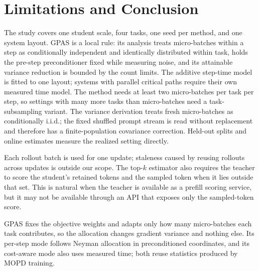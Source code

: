 \section{Limitations and Conclusion}
\label{sec:conclusion}

The study covers one student scale, four tasks, one seed per method, and one
system layout. GPAS is a local rule: its analysis treats micro-batches within
a step as conditionally independent and identically distributed within task,
holds the pre-step preconditioner fixed while
measuring noise, and its attainable variance reduction is bounded by the count
limits. The additive step-time model is fitted to one layout; systems with
parallel critical paths require their own measured time model. The method needs
at least two micro-batches per task per step, so settings with many more tasks
than micro-batches need a task-subsampling variant.
The variance derivation treats fresh micro-batches as conditionally i.i.d.; the
fixed shuffled prompt stream is read without replacement and therefore has a
finite-population covariance correction. Held-out splits and online estimates
measure the realized setting directly.

Each rollout batch is used for one update; staleness caused by reusing rollouts
across updates is outside our scope. The top-$k$ estimator also requires the
teacher to score the student's retained tokens and the sampled token when it
lies outside that set. This is natural when the teacher is available as a
prefill scoring service, but it may
not be available through an API that exposes only the sampled-token score.

GPAS fixes the objective weights and adapts only how many micro-batches each
task contributes, so the allocation changes gradient variance and nothing
else. Its per-step mode follows Neyman allocation in preconditioned coordinates,
and its cost-aware mode also uses measured time; both reuse statistics produced
by MOPD training. 
